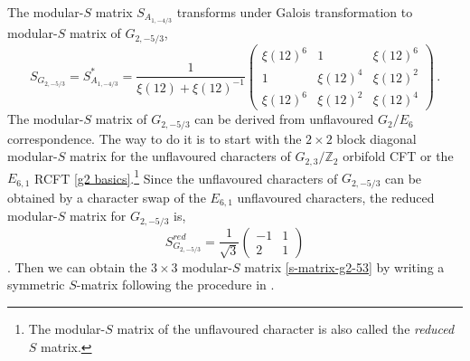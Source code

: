 \documentclass[a4paper,12pt]{article}
\begin{document}
The modular-$S$ matrix $S_{A_{1,-4/3}}$ transforms under Galois transformation to modular-$S$ matrix of $G_{2,-5/3}$,
\begin{equation}\label{s-matrix-g2-53}
  S_{G_{2,-5/3}}=S_{A_{1,-4/3}}^{*}=\frac{1}{\xi(12)+\xi(12)^{-1}}\begin{pmatrix}
\xi(12)^6 & 1 &\xi(12)^6\\
1 & \xi(12)^4 & \xi(12)^2 \\
\xi(12)^6 & \xi(12)^2 & \xi(12)^4
\end{pmatrix}\, .
\end{equation}
The modular-$S$ matrix of $G_{2,-5/3}$ can be derived from unflavoured $G_2/E_6$ correspondence. The way to do it is to start with the $2\times 2$ block diagonal modular-$S$ matrix for the unflavoured characters of $G_{2,3}/\mathbb{Z}_2$ orbifold CFT or the $E_{6,1}$ RCFT \eqref{g2 basics}.\footnote{The modular-$S$ matrix of the unflavoured character is also called the \textit{reduced} $S$ matrix.} Since the unflavoured characters of $G_{2,-5/3}$ can be obtained by a character swap of the $E_{6,1}$ unflavoured characters, the reduced modular-$S$ matrix for $G_{2,-5/3}$ is,
\begin{equation}
    S_{G_{2,-5/3}}^{red}=\frac{1}{\sqrt{3}}\begin{pmatrix}
      -1 & 1\\
      2 & 1
    \end{pmatrix}
\end{equation}.
Then we can obtain the $3\times 3$ modular-$S$ matrix \eqref{s-matrix-g2-53} by writing a symmetric $S$-matrix following the procedure in \cite{Mathur:1988gt}. 
\end{document}
